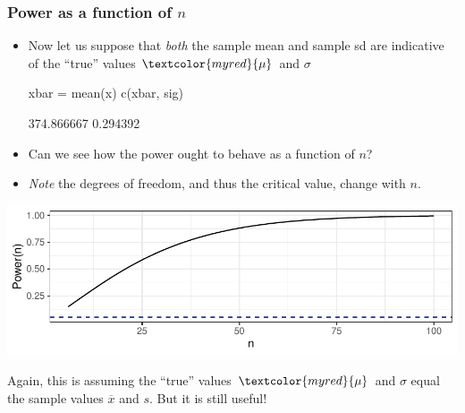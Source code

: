 \documentclass[a4paper]{article}
\begin{document}
\subsubsection{Power as a function of \( n \)}
\begin{itemize}
	\item Now let us suppose that \textit{both} the sample mean and sample sd are indicative of the ``true'' values \( \textcolor{myred}{\mu} \) and \( \sigma \) 
\begin{Schunk}
\begin{Sinput}
xbar = mean(x)
c(xbar, sig)
\end{Sinput}
\begin{Soutput}
[1] 374.866667   0.294392
\end{Soutput}
\end{Schunk}
	\item Can we see how the power ought to behave as a function of \( n \)?
	\item \textit{Note} the degrees of freedom, and thus the critical value, change with \( n \).
\end{itemize}
\begin{Schunk}


{\centering \includegraphics[width=\maxwidth]{figure/listings-unnamed-chunk-99-1} 

}

\end{Schunk}
Again, this is assuming the ``true'' values \( \textcolor{myred}{\mu} \) and \( \sigma \) equal the sample values \( \overline{x} \) and \( s \). But it is still useful!
\end{document}
